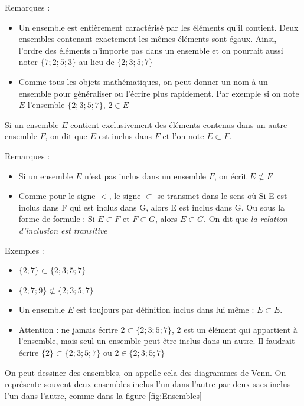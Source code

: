 \documentclass[10pt,a4paper,oneside]{book}
\begin{document}
Remarques : 
\begin{itemize}
\item Un ensemble est entièrement caractérisé par les éléments qu'il contient. Deux ensembles contenant exactement les mêmes éléments sont égaux. Ainsi, l'ordre des éléments n'importe pas dans un ensemble et on pourrait aussi noter $\{7;2;5;3\}$ au lieu de $\{2;3;5;7\}$
\item Comme tous les objets mathématiques, on peut donner un nom à un ensemble pour généraliser ou l'écrire plus rapidement. Par exemple si on note $E$ l'ensemble $\{2;3;5;7\}$, $2 \in E$
\end{itemize}


\begin{de}
     Si un ensemble $E$ contient exclusivement des éléments contenus dans un autre ensemble $F$, on dit que $E$ est \underline{inclus} dans $F$ et l'on note $E \subset F$.
\end{de}

Remarques :
\begin{itemize}
    \item Si un ensemble $E$ n'est pas inclus dans un ensemble $F$, on écrit $E \not\subset F$
    \item Comme pour le signe $<$, le signe $\subset$ se transmet dans le sens où Si E est inclus dans F qui est inclus dans G, alors E est inclus dans G. Ou sous la forme de formule : Si $E \subset F$ et $F \subset G$, alors $E \subset G$. On dit que \textit{la relation d'inclusion est transitive}
\end{itemize}
    

Exemples : 
\begin{itemize}
    \item $\{2;7\} \subset \{2;3;5;7\}$
    \item $\{2;7;9\} \not\subset \{2;3;5;7\}$
    \item Un ensemble $E$ est toujours par définition inclus dans lui même : $E \subset E$.
    \item Attention : ne jamais écrire $2 \subset \{2;3;5;7\}$, $2$ est un élément qui appartient à l'ensemble, mais seul un ensemble peut-être inclus dans un autre. Il faudrait écrire $\{2\} \subset \{2;3;5;7\}$ ou $2 \in \{2;3;5;7\}$
\end{itemize}

On peut dessiner des ensembles, on appelle cela des diagrammes de Venn. On représente souvent deux ensembles inclus l'un dans l'autre par deux sacs inclus l'un dans l'autre, comme dans la figure \ref{fig:Ensembles}
\end{document}
